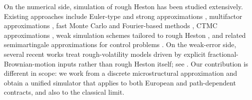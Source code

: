 \documentclass[letterpaper]{article}
\numberwithin{equation}{section}
\theoremstyle{definition}
\theoremstyle{remark}
\begin{document}
On the numerical side, simulation of rough Heston has been studied extensively. Existing approaches include Euler-type and strong approximations \cite{liang2017strong,RICHARD2021109,richard2023discrete}, multifactor approximations \cite{abi2019multifactor}, fast Monte Carlo and Fourier-based methods \cite{ma2022fast,callegaro2021fast,boyarchenko2025fast}, CTMC approximations \cite{yang2024}, weak simulation schemes tailored to rough Heston \cite{BayerBreneis2024WeakRoughHeston}, and related semimartingale approximations for control problems \cite{ma2023optimal}. On the weak-error side, several recent works treat rough-volatility models driven by explicit fractional-Brownian-motion inputs rather than rough Heston itself; see \cite{Gassiat2023WeakRoughVol,BayerHallTempone2021WeakLinearRoughVol,FrizSalkeldWagenhofer2024WeakRoughVol}. Our contribution is different in scope: we work from a discrete microstructural approximation and obtain a unified simulator that applies to both European and path-dependent contracts, and also to the classical limit.
\end{document}
